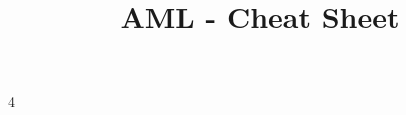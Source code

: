 \documentclass[%
    ,a4paper
    ,fontsize=10.2pt %
    ,landscape
    ,pagesize
    ,headinclude
    ]{scrartcl}
\title{AML - Cheat Sheet}
\author{}%
\date{}%
\begin{document}
\begin{multicols*}{4}



%




% 



% 






\end{multicols*}
\end{document}
